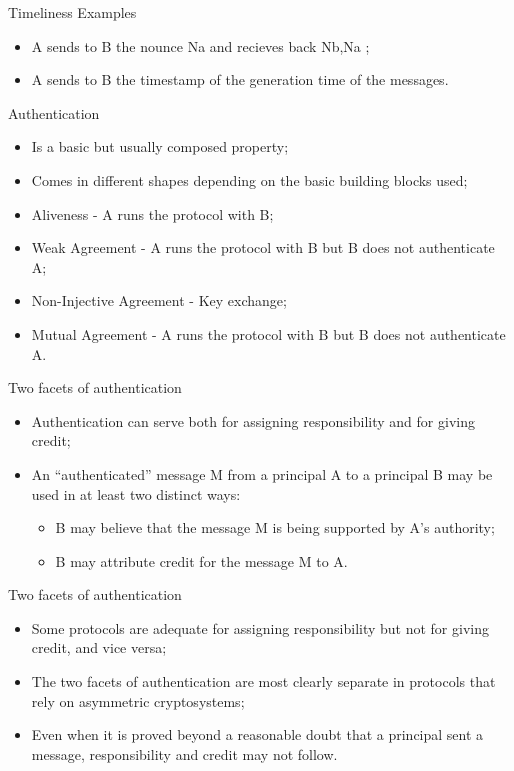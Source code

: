 \documentclass[12pt,table,xcolor={dvipsnames}]{beamer}
\begin{document}
\begin{frame}{Timeliness Examples}
\begin{itemize}
\item A sends to B the nounce Na and recieves back Nb,Na ;\pause
\item A sends to B the timestamp of the generation time of the messages.
\end{itemize}
\end{frame}

\begin{frame}{Authentication}
\begin{itemize}
\item Is a basic but usually composed property;\pause
\item Comes in different shapes depending on the basic building blocks used;\pause
\item Aliveness - A runs the protocol with B;\pause
\item Weak Agreement - A runs the protocol with B but B does not authenticate A;\pause
\item Non-Injective Agreement - Key exchange;\pause
\item Mutual Agreement - A runs the protocol with B but B does not authenticate A.
\end{itemize}
\end{frame}

\begin{frame}{Two facets of authentication}
\begin{itemize}
\item Authentication can serve both for assigning responsibility and for giving credit;\pause
\item An ``authenticated'' message M from a principal A to a principal B may be used in at least two distinct ways:\pause
\begin{itemize}
\item B may believe that the message M is being supported by A’s authority;\pause
\item B may attribute credit for the message M to A.\pause
\end{itemize}
\end{itemize}
\end{frame}


\begin{frame}{Two facets of authentication}
\begin{itemize}
\item Some protocols are adequate for assigning responsibility but not for giving credit, and vice versa;\pause
\item The two facets of authentication are most clearly separate in protocols
that rely on asymmetric cryptosystems;\pause
\item Even when it is proved beyond a reasonable doubt that a principal sent a message, responsibility and credit may not follow.
\end{itemize}
\end{frame}
\end{document}
